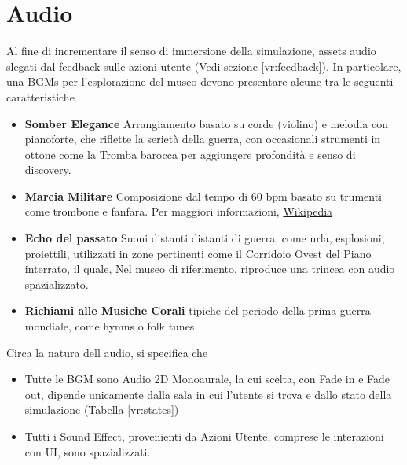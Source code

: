 \documentclass[10pt, openany]{article}
\begin{document}
    \section{Audio}\label{vr:audio}
    Al fine di incrementare il senso di immersione della simulazione, assets audio slegati dal feedback sulle azioni utente (Vedi sezione \ref{vr:feedback}). In particolare,
    una BGMs per l'esplorazione del museo devono presentare alcune tra le seguenti caratteristiche
    \begin{itemize}[noitemsep, topsep=0pt]
      \item \textbf{Somber Elegance} Arrangiamento basato su corde (violino) e melodia con pianoforte, che riflette la seriet\`a della guerra, con occasionali strumenti in ottone come
        la Tromba barocca per aggiungere profondit\`a e senso di discovery.
      \item \textbf{Marcia Militare} Composizione dal tempo di 60 bpm basato su trumenti come trombone e fanfara. Per maggiori informazioni, 
        \href{https://it.wikipedia.org/wiki/Marcia_(musica)#Struttura_e_caratteristiche}{Wikipedia}
      \item \textbf{Echo del passato} Suoni distanti distanti di guerra, come urla, esplosioni, proiettili, utilizzati in zone pertinenti come il Corridoio Ovest del Piano interrato, 
        il quale, Nel museo di riferimento, riproduce una trincea con audio spazializzato.
      \item \textbf{Richiami alle Musiche Corali} tipiche del periodo della prima guerra mondiale, come hymns o folk tunes.
    \end{itemize}
    Circa la natura dell audio, si specifica che
    \begin{itemize}[topsep=0pt, noitemsep]
      \item Tutte le BGM sono Audio 2D Monoaurale, la cui scelta, con Fade in e Fade out, dipende unicamente dalla sala in cui l'utente si trova e dallo stato della 
        simulazione (Tabella \ref{vr:states})
      \item Tutti i Sound Effect, provenienti da Azioni Utente, comprese le interazioni con UI, sono spazializzati.
    \end{itemize}
\end{document}
